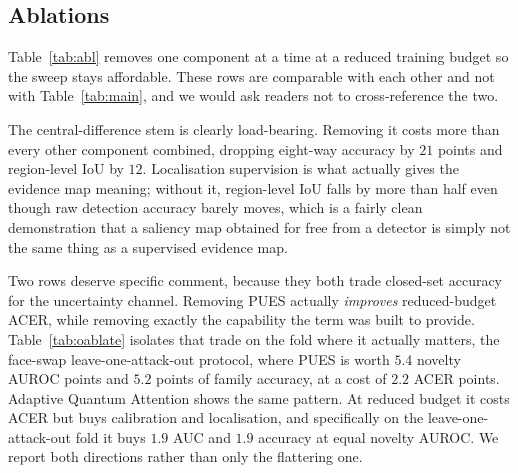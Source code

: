 \documentclass[conference]{IEEEtran}
\begin{document}
\subsection{Ablations}\label{sec:abl}
Table~\ref{tab:abl} removes one component at a time at a reduced training budget so
the sweep stays affordable. These rows are comparable with each other and not with
Table~\ref{tab:main}, and we would ask readers not to cross-reference the two.

\begin{table}[t]
\centering
\caption{Component ablation at a reduced training budget. Deltas are relative to the
full model in the first row. These rows are comparable with each other but not
directly with Table~\ref{tab:main}.}
\label{tab:abl}
\small

\end{table}

The central-difference stem is clearly load-bearing. Removing it costs more than
every other component combined, dropping eight-way accuracy by $21$ points and
region-level IoU by $12$. Localisation supervision is what actually gives the
evidence map meaning; without it, region-level IoU falls by more than half even
though raw detection accuracy barely moves, which is a fairly clean demonstration
that a saliency map obtained for free from a detector is simply not the same thing as
a supervised evidence map.

Two rows deserve specific comment, because they both trade closed-set accuracy for
the uncertainty channel. Removing PUES actually \emph{improves} reduced-budget ACER,
while removing exactly the capability the term was built to provide.
Table~\ref{tab:oablate} isolates that trade on the fold where it actually matters,
the face-swap leave-one-attack-out protocol, where PUES is worth $5.4$ novelty AUROC
points and $5.2$ points of family accuracy, at a cost of $2.2$ ACER points. Adaptive
Quantum Attention shows the same pattern. At reduced budget it costs ACER but buys
calibration and localisation, and specifically on the leave-one-attack-out fold it
buys $1.9$ AUC and $1.9$ accuracy at equal novelty AUROC. We report both directions
rather than only the flattering one.

\begin{table}[t]
\centering
\caption{Open-set ablation on the face-swap leave-one-attack-out fold, where the
uncertainty channel is actually exercised.}
\label{tab:oablate}
\small
\resizebox{\linewidth}{!}{}
\end{table}
\end{document}
